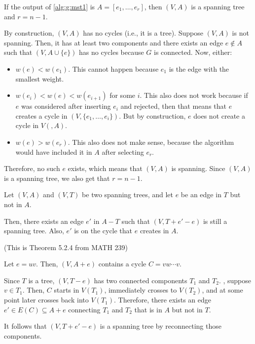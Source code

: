 \begin{claim}\label{claim:g:2}
  If the output of \cref{alg:g:mst1} is $A = [e_1,\dotsc,e_r]$,
  then $(V,A)$ is a spanning tree and $r = n-1$.
\end{claim}
\begin{prf}
  By construction, $(V,A)$ has no cycles (i.e., it is a tree).
  Suppose $(V,A)$ is not spanning.
  Then, it has at least two components and there exists an edge $e \not\in A$
  such that $(V,A\cup\{e\})$ has no cycles because $G$ is connected.
  Now, either:
  \begin{itemize}
    \item $w(e) < w(e_1)$. This cannot happen because $e_1$ is the edge with the smallest weight.
    \item $w(e_i) < w(e) < w(e_{i+1})$ for some $i$.
          This also does not work because if $e$ was considered after inserting $e_i$
          and rejected, then that means that $e$ creates a cycle in $(V,\{e_1,\dotsc,e_i\})$.
          But by construction, $e$ does not create a cycle in $V(,A)$.
    \item $w(e) > w(e_r)$. This also does not make sense, because the algorithm
          would have included it in $A$ after selecting $e_r$.
  \end{itemize}
  Therefore, no such $e$ exists, which means that $(V,A)$ is spanning.
  Since $(V,A)$ is a spanning tree, we also get that $r = n-1$.
\end{prf}

\begin{claim}\label{claim:g:3}
  Let $(V, A)$ and $(V, T)$ be two spanning trees,
  and let $e$ be an edge in $T$ but not in $A$.

  Then, there exists an edge $e'$ in $A - T$ such that
  $(V, T + e' - e)$ is still a spanning tree.
  Also, $e'$ is on the cycle that $e$ creates in $A$.

  (This is Theorem 5.2.4 from MATH 239)
\end{claim}
\begin{prf}
  Let $e = uv$. Then, $(V,A+e)$ contains a cycle $C = vw\cdots v$.

  Since $T$ is a tree, $(V,T-e)$ has two connected components $T_1$ and $T_2$.
  \WLOG, suppose $v \in T_1$.
  Then, $C$ starts in $V(T_1)$, immediately crosses to $V(T_2)$,
  and at some point later crosses back into $V(T_1)$.
  Therefore, there exists an edge $e' \in E(C) \subseteq A+e$ connecting $T_1$ and $T_2$
  that is in $A$ but not in $T$.

  It follows that $(V,T+e'-e)$ is a spanning tree by reconnecting those components.
\end{prf}

